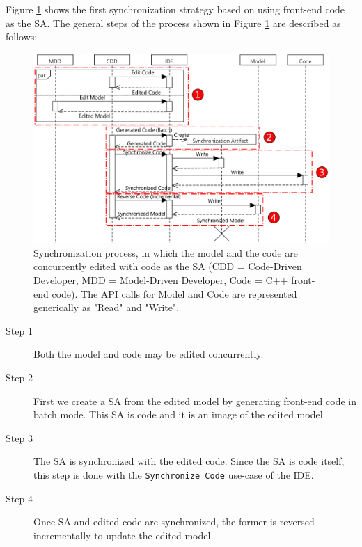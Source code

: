 Figure \ref{fig:scenario3} shows the first synchronization
strategy based on using front-end code as the SA.
The general steps of the process shown in Figure \ref{fig:scenario3} are described as follows:

\begin{figure}
	\centering
	\includegraphics[width = \columnwidth]{figures/scenario3_seq}
	\caption{Synchronization process, in which the model and the code are concurrently edited with code as the SA (CDD = Code-Driven Developer, MDD = Model-Driven Developer, Code = C++ front-end code). The API calls for Model and Code are represented generically as "Read" and "Write".}
	\label{fig:scenario3}
\end{figure}

\begin{description}
	\item[Step 1] Both the model and code may be edited concurrently.
	\item[Step 2] First we create a SA from the edited model by generating front-end code in batch mode.
	This SA is code and it is an image of the edited model.	
	
	\item[Step 3] The SA is synchronized with the edited code. Since the SA
	is code itself, this step is done with the \texttt{Synchronize Code} use-case of the IDE.
	
	\item[Step 4] Once SA and edited code are synchronized, the former is reversed incrementally to update the edited model.
\end{description}

